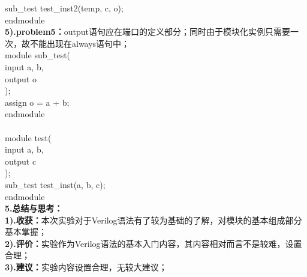 \documentclass[12pt]{ctexart}
\begin{document}
\hspace*{0.5cm}sub\_test test\_inst2(temp, c, o);\\
endmodule\\
{\bf5).problem5：}output语句应在端口的定义部分；同时由于模块化实例只需要一次，故不能出现在always语句中；\\
module sub\_test(\\
input a, b,\\
output o\\
);\\
\hspace*{0.5cm}assign o = a + b;\\
endmodule\\\\
module test(\\
input a, b,\\
output c\\
);\\
\hspace*{0.5cm}sub\_test test\_inst(a, b, c);\\
endmodule\\
{\bf5.总结与思考：}\\
{\bf1).收获：}本次实验对于Verilog语法有了较为基础的了解，对模块的基本组成部分基本掌握；\\
{\bf2).评价：}实验作为Verilog语法的基本入门内容，其内容相对而言不是较难，设置合理；\\
{\bf3).建议：}实验内容设置合理，无较大建议；
\end{document}
